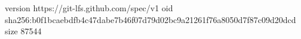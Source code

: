 version https://git-lfs.github.com/spec/v1
oid sha256:b0f1bcaebdfb4c47dabe7b46f07d79d02bc9a21261f76a8050d7f87c09d20dcd
size 87544

